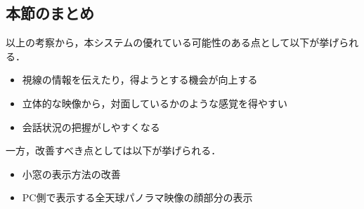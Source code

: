 \subsection*{本節のまとめ}
以上の考察から，本システムの優れている可能性のある点として以下が挙げられる．
\begin{itemize}
  \item 視線の情報を伝えたり，得ようとする機会が向上する
  \item 立体的な映像から，対面しているかのような感覚を得やすい
  \item 会話状況の把握がしやすくなる
\end{itemize}

一方，改善すべき点としては以下が挙げられる．
\begin{itemize}
  \item 小窓の表示方法の改善
  \item PC側で表示する全天球パノラマ映像の顔部分の表示
\end{itemize}













